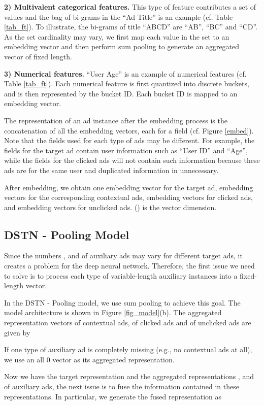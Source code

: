 \documentclass[sigconf]{acmart}
\begin{document}
\textbf{2) Multivalent categorical features.} This type of feature contributes a set of values and the bag of bi-grams in the ``Ad Title'' is an example (cf. Table \ref{tab_ft}). To illustrate, the bi-grams of title ``ABCD'' are ``AB'', ``BC'' and ``CD''.
As the set cardinality may vary, we first map each value in the set to an embedding vector and then perform sum pooling to generate an aggregated vector of fixed length.

\textbf{3) Numerical features.} ``User Age'' is an example of numerical features (cf. Table \ref{tab_ft}). Each numerical feature is first quantized into discrete buckets, and is then represented by the bucket ID. Each bucket ID is mapped to an embedding vector.

The representation  of an ad instance after the embedding process is the concatenation of all the embedding vectors, each for a field (cf. Figure \ref{embed}).
Note that the fields used for each type of ads may be different. For example, the fields for the target ad contain user information such as ``User ID'' and ``Age'', while the fields for the clicked ads will not contain such information because these ads are for the same user and duplicated information in unnecessary.

After embedding, we obtain one embedding vector  for the target ad,  embedding vectors  for the corresponding contextual ads,  embedding vectors  for clicked ads, and  embedding vectors  for unclicked ads.  () is the vector dimension.


\subsection{DSTN - Pooling Model} \label{sec_base}
Since the numbers ,  and  of auxiliary ads may vary for different target ads, it creates a problem for the deep neural network. Therefore, the first issue we need to solve is to process each type of variable-length auxiliary instances into a fixed-length vector.

In the DSTN - Pooling model, we use sum pooling to achieve this goal. The model architecture is shown in Figure \ref{fig_model}(b). The aggregated representation vectors  of  contextual ads,  of  clicked ads and  of  unclicked ads are given by

If one type of auxiliary ad is completely missing (e.g., no contextual ads at all), we use an all 0 vector as its aggregated representation.

Now we have the target representation  and the aggregated representations ,  and  of auxiliary ads, the next issue is to fuse the information contained in these representations. In particular, we generate the fused representation  as
\end{document}
